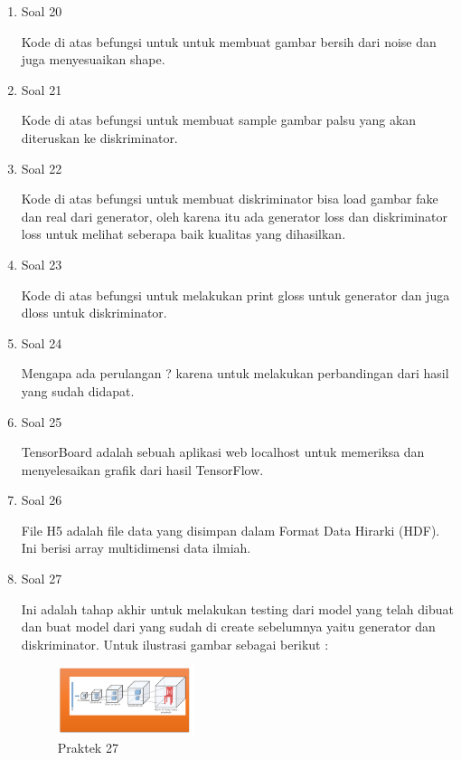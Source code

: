 \begin{enumerate}
    \item Soal 20
	\hfill\break
	
    Kode di atas befungsi untuk untuk membuat gambar bersih dari noise dan juga menyesuaikan shape.
    
    \item Soal 21
	\hfill\break
	
    Kode di atas befungsi untuk membuat sample gambar palsu yang akan diteruskan ke diskriminator.
    
    \item Soal 22
	\hfill\break
	
	Kode di atas befungsi untuk membuat diskriminator bisa load gambar fake dan real dari generator, oleh karena itu ada generator loss dan diskriminator loss untuk melihat seberapa baik kualitas yang dihasilkan.

    \item Soal 23
	\hfill\break
	
    Kode di atas befungsi untuk melakukan print gloss untuk generator dan juga dloss untuk diskriminator.
    
    \item Soal 24
	\hfill\break
	
    Mengapa ada perulangan ? karena untuk melakukan perbandingan dari hasil yang sudah didapat.
    
    \item Soal 25
	\hfill\break
	
    TensorBoard adalah sebuah aplikasi web localhost untuk memeriksa dan menyelesaikan grafik dari hasil TensorFlow.
    
    \item Soal 26
	\hfill\break
	
    File H5 adalah file data yang disimpan dalam Format Data Hirarki (HDF). Ini berisi array multidimensi data ilmiah.
    
    \item Soal 27
	\hfill\break
	
    Ini adalah tahap akhir untuk melakukan testing dari model yang telah dibuat dan buat model dari yang sudah di create sebelumnya yaitu generator dan diskriminator. Untuk ilustrasi gambar sebagai berikut : 
    \begin{figure}[H]
		\includegraphics[width=4cm]{figures/1174027/8/praktek27.png}
		\centering
		\caption{Praktek 27}
    \end{figure}
\end{enumerate}
